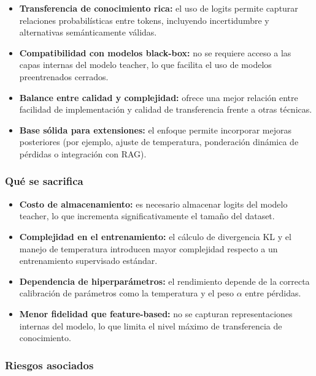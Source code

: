 \documentclass[12pt]{article}
\begin{document}
	\begin{itemize}
		\item \textbf{Transferencia de conocimiento rica:} el uso de logits permite capturar relaciones probabilísticas entre tokens, incluyendo incertidumbre y alternativas semánticamente válidas.
		
		\item \textbf{Compatibilidad con modelos black-box:} no se requiere acceso a las capas internas del modelo teacher, lo que facilita el uso de modelos preentrenados cerrados.
		
		\item \textbf{Balance entre calidad y complejidad:} ofrece una mejor relación entre facilidad de implementación y calidad de transferencia frente a otras técnicas.
		
		\item \textbf{Base sólida para extensiones:} el enfoque permite incorporar mejoras posteriores (por ejemplo, ajuste de temperatura, ponderación dinámica de pérdidas o integración con RAG).
	\end{itemize}
	
	\subsubsection{Qué se sacrifica}
	
	\begin{itemize}
		\item \textbf{Costo de almacenamiento:} es necesario almacenar logits del modelo teacher, lo que incrementa significativamente el tamaño del dataset.
		
		\item \textbf{Complejidad en el entrenamiento:} el cálculo de divergencia KL y el manejo de temperatura introducen mayor complejidad respecto a un entrenamiento supervisado estándar.
		
		\item \textbf{Dependencia de hiperparámetros:} el rendimiento depende de la correcta calibración de parámetros como la temperatura y el peso $\alpha$ entre pérdidas.
		
		\item \textbf{Menor fidelidad que feature-based:} no se capturan representaciones internas del modelo, lo que limita el nivel máximo de transferencia de conocimiento.
	\end{itemize}
	
	\subsubsection{Riesgos asociados}
	
\end{document}
